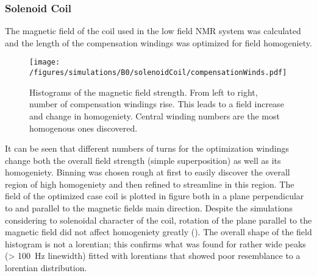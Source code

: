             \subsubsection{Solenoid Coil}
            The magnetic field of the coil used in the low field NMR system was calculated and the length of the compensation windings was optimized for field homogeniety.
                \begin{figure}
                    \centering
                    \texttt{[image: /figures/simulations/B0/solenoidCoil/compensationWinds.pdf]}
                    \caption[Compensation wind optimization]{Histograms of the magnetic field strength. From left to right, number of compensation windings rise. This leads to a field increase and change in homogeniety. Central winding numbers are the most homogenous ones discovered.}
                    \label{fig:results:compensationWindOptimization}
                \end{figure}
            It can be seen that different numbers of turns for the optimization windings change both the overall field strength (simple superposition) as well as its homogeniety. Binning was chosen rough at first to easily discover the overall region of high homogeniety and then refined to streamline in this region.
            The field of the optimized case coil is plotted in figure  both in a plane perpendicular to and parallel to the magnetic fields main direction. Despite the simulations considering to solenoidal character of the coil, rotation of the plane parallel to the magnetic field did not affect homogeniety greatly (). The overall shape of the field histogram is not a lorentian; this confirms what was found for rather wide peaks (> \SI{100}{\hertz} linewidth) fitted with lorentians that showed poor resemblance to a lorentian distribution.
